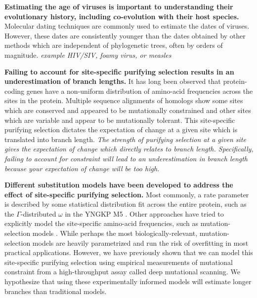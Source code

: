 \documentclass[11pt]{article}
\begin{document}
\textbf{Estimating the age of viruses is important to understanding their evolutionary history, including co-evolution with their host species.}
Molecular dating techniques are commonly used to estimate the dates of viruses. 
However, these dates are consistently younger than the dates obtained by other methods which are independent of phylogenetic trees, often by orders of magnitude. 
\textit{example HIV/SIV, foamy virus, or measles}

\textbf{Failing to account for site-specific purifying selection results in an underestimation of branch lengths.} 
It has long been observed that protein-coding genes have a non-uniform distribution of amino-acid frequencies across the sites in the protein. 
Multiple sequence alignments of homologs show some sites which are conserved and appeared to be mutationally constrained and other sites which are variable and appear to be mutationally tolerant. 
This site-specific purifying selection dictates the expectation of change at a given site which is translated into branch length. 
\textit{The strength of purifying selection at a given site gives the expectation of change which directly relates to branch length. 
Specifically, failing to account for constraint will lead to an underestimation in branch length because your expectation of change will be too high.} 

\textbf{Different substitution models have been developed to address the effect of site-specific purifying selection.}
Most commonly, a rate parameter is described by some statistical distribution fit across the entire protein, such as the $\Gamma$-distributed $\omega$ in the YNGKP M5 \citep{yang2000codon}. 
Other approaches have tried to explicitly model the site-specific amino-acid frequencies, such as mutation-selection models \citep{halpern1998evolutionary}. 
While perhaps the most biologically-relevant, mutation-selection models are heavily parametrized and run the risk of overfitting in most practical applications. 
However, we have previously shown that we can model this site-specific purifying selection using empirical measurements of mutational constraint from a high-throughput assay called deep mutational scanning. 
We hypothesize that using these experimentally informed models will estimate longer branches than traditional models. 
\end{document}
